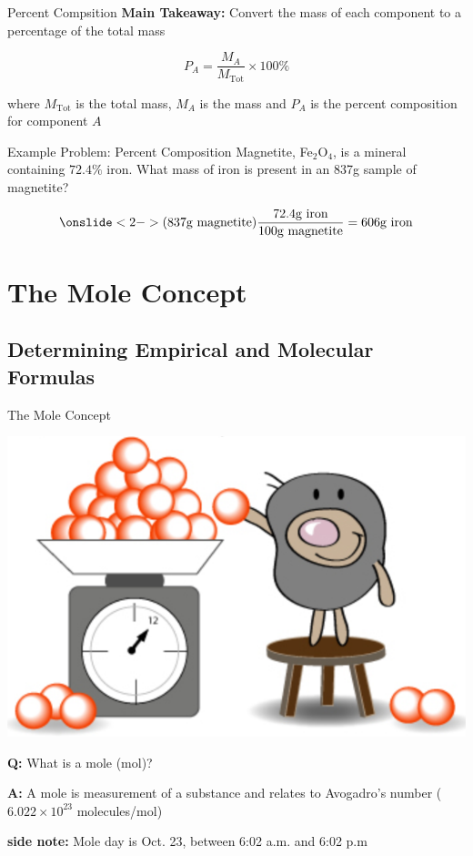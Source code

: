 \documentclass[11pt]{beamer}
\begin{document}
\begin{frame}{Percent Compsition}
  \textbf{Main Takeaway:} Convert the mass of each component
  to a percentage of the total mass

  \begin{equation}
    P_A = \frac{M_A}{M_\text{Tot}} \times 100\%
  \end{equation}

  where $M_\text{Tot}$ is the total mass, $M_A$ is the mass and $P_A$
  is the percent composition for component $A$
\end{frame}

\begin{frame}{Example Problem: Percent Composition}
  Magnetite, Fe$_2$O$_4$, is a mineral containing $72.4\%$ iron. What
  mass of iron is present in an 837g sample of magnetite?

  \begin{align*}
   \onslide<2->{ (837 \text{g magnetite})\frac{72.4 \text{g iron}}{100 \text{g magnetite}}
    = 606 \text{g iron}}
  \end{align*}
  
\end{frame}

\section{The Mole Concept}

\subsection{Determining Empirical and Molecular Formulas}

\begin{frame}{The Mole Concept}
  \begin{center}
    \includegraphics[scale=0.2]{mole}
  \end{center}
  
  \textbf{Q:} What is a mole (mol)?

  \textbf{A:} A mole is measurement of a substance and relates to
  Avogadro's number ($6.022 \times 10^{23}$ molecules/mol)

  \textbf{side note:} Mole day is Oct. 23, between 6:02 a.m. and 6:02 p.m
\end{frame}
\end{document}
